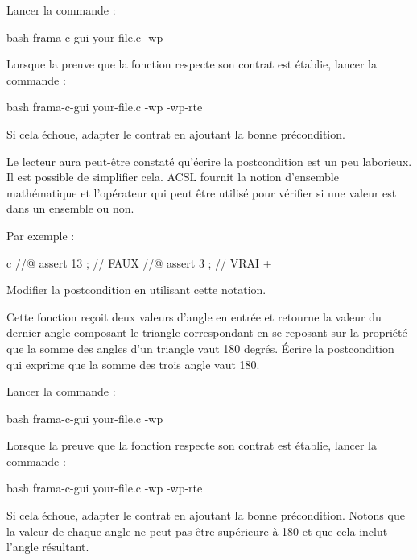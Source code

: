 Lancer la commande :


\begin{CodeBlock}{bash}
frama-c-gui your-file.c -wp
\end{CodeBlock}


Lorsque la preuve que la fonction respecte son contrat est établie, lancer
la commande :

\begin{CodeBlock}{bash}
frama-c-gui your-file.c -wp -wp-rte
\end{CodeBlock}


Si cela échoue, adapter le contrat en ajoutant la bonne précondition.


Le lecteur aura peut-être constaté qu'écrire la postcondition est un peu
laborieux. Il est possible de simplifier cela. ACSL fournit la notion
d'ensemble mathématique et l'opérateur  qui
peut être utilisé pour vérifier si une valeur est dans un ensemble ou non.


Par exemple :

\begin{CodeBlock}{c}
//@ assert 13  ; // FAUX
//@ assert 3   ; // VRAI
+\end{CodeBlock}


Modifier la postcondition en utilisant cette notation.




Cette fonction reçoit deux valeurs d'angle en entrée et retourne
la valeur du dernier angle composant le triangle correspondant en se
reposant sur la propriété que la somme des angles d'un triangle vaut
180 degrés. Écrire la postcondition qui exprime que la somme des trois
angle vaut 180.




Lancer la commande :


\begin{CodeBlock}{bash}
frama-c-gui your-file.c -wp
\end{CodeBlock}


Lorsque la preuve que la fonction respecte son contrat est établie, lancer
la commande :

\begin{CodeBlock}{bash}
frama-c-gui your-file.c -wp -wp-rte
\end{CodeBlock}


Si cela échoue, adapter le contrat en ajoutant la bonne précondition.
Notons que la valeur de chaque angle ne peut pas être supérieure à 180
et que cela inclut l'angle résultant.
